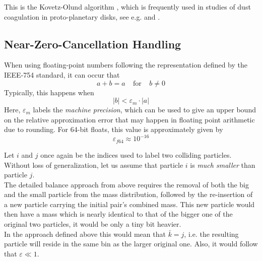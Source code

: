         This is the Kovetz-Olund algorithm \cite{kovetz_olund_1969}, which is frequently used 
        in studies of dust coagulation in proto-planetary disks, see e.g.
        \cite{brauer_dullemond_henning_2007} and \cite{birnstiel_dullemond_brauer_2010}.
    
    \clearpage\subsection{Near-Zero-Cancellation Handling}
    \label{sec:near_zero_cancellation_handling}
    
        When using floating-point numbers following the representation defined
        by the IEEE-754 standard, it can occur that
        \begin{equation}
          a + b = a
          \ \ \ \ \ \text{for} \ \ \ \ \
          b\neq0
        \end{equation}
        Typically, this happens when
        \begin{equation}
            |b| < \varepsilon_m \cdot |a|
        \end{equation}
        Here, $\varepsilon_m$ labels the \textit{machine precision}, which can be used to give 
        an upper bound on the relative approximation error that may happen in floating point 
        arithmetic due to rounding. For 64-bit floats, this value is approximately given by
        \begin{equation}
            \varepsilon_{f64} \approx 10^{-16}
        \end{equation}
        
        Let $i$ and $j$ once again be the indices used to label two colliding particles. 
        Without loss of generalization, let us assume that particle $i$ is 
        \textit{much smaller} than particle $j$. \\
        
        The detailed balance approach from above requires the removal of both the big and the small 
        particle from the mass distribution, followed by the re-insertion of a new particle 
        carrying the initial pair's combined mass. This new particle would then have a mass which 
        is nearly identical to that of the bigger one of the original two particles, it would be 
        only a tiny bit heavier.\\
        
        In the approach defined above this would mean that $\bar k=j$, i.e. the resulting particle 
        will reside in the same bin as the larger original one. Also, it would follow that 
        $\varepsilon\ll1$.\\
        
